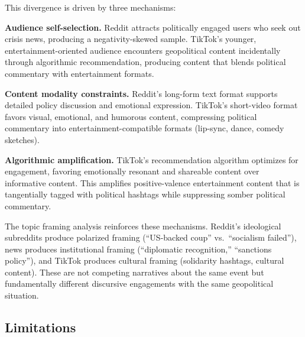 \documentclass[12pt, letterpaper]{article}
\begin{document}
This divergence is driven by three mechanisms:

\textbf{Audience self-selection.} Reddit attracts politically engaged users who seek out crisis news, producing a negativity-skewed sample. TikTok's younger, entertainment-oriented audience encounters geopolitical content incidentally through algorithmic recommendation, producing content that blends political commentary with entertainment formats.

\textbf{Content modality constraints.} Reddit's long-form text format supports detailed policy discussion and emotional expression. TikTok's short-video format favors visual, emotional, and humorous content, compressing political commentary into entertainment-compatible formats (lip-sync, dance, comedy sketches).

\textbf{Algorithmic amplification.} TikTok's recommendation algorithm optimizes for engagement, favoring emotionally resonant and shareable content over informative content. This amplifies positive-valence entertainment content that is tangentially tagged with political hashtags while suppressing somber political commentary.

The topic framing analysis reinforces these mechanisms. Reddit's ideological subreddits produce polarized framing (``US-backed coup'' vs.\ ``socialism failed''), news produces institutional framing (``diplomatic recognition,'' ``sanctions policy''), and TikTok produces cultural framing (solidarity hashtags, cultural content). These are not competing narratives about the same event but fundamentally different discursive engagements with the same geopolitical situation.

\subsection{Limitations}
\end{document}
